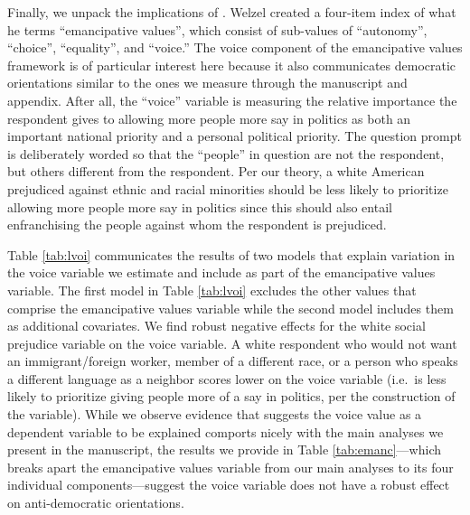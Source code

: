\documentclass[11pt,]{article}
\begin{document}
Finally, we unpack the implications of \citet{welzel2013fr}. Welzel
created a four-item index of what he terms ``emancipative values'',
which consist of sub-values of ``autonomy'', ``choice'', ``equality'',
and ``voice.'' The voice component of the emancipative values framework
is of particular interest here because it also communicates democratic
orientations similar to the ones we measure through the manuscript and
appendix. After all, the ``voice'' variable is measuring the relative
importance the respondent gives to allowing more people more say in
politics as both an important national priority and a personal political
priority. The question prompt is deliberately worded so that the
``people'' in question are not the respondent, but others different from
the respondent. Per our theory, a white American prejudiced against
ethnic and racial minorities should be less likely to prioritize
allowing more people more say in politics since this should also entail
enfranchising the people against whom the respondent is prejudiced.

Table \ref{tab:lvoi} communicates the results of two models that explain
variation in the voice variable we estimate and include as part of the
emancipative values variable. The first model in Table \ref{tab:lvoi}
excludes the other values that comprise the emancipative values variable
while the second model includes them as additional covariates. We find
robust negative effects for the white social prejudice variable on the
voice variable. A white respondent who would not want an
immigrant/foreign worker, member of a different race, or a person who
speaks a different language as a neighbor scores lower on the voice
variable (i.e.~is less likely to prioritize giving people more of a say
in politics, per the construction of the variable). While we observe
evidence that suggests the voice value as a dependent variable to be
explained comports nicely with the main analyses we present in the
manuscript, the results we provide in Table \ref{tab:emanc}---which
breaks apart the emancipative values variable from our main analyses to
its four individual components---suggest the voice variable does not
have a robust effect on anti-democratic orientations.

 
  \providecommand{\huxb}[2]{\arrayrulecolor[RGB]{#1}\global\arrayrulewidth=#2pt}
  \providecommand{\huxvb}[2]{\color[RGB]{#1}\vrule width #2pt}
  \providecommand{\huxtpad}[1]{\rule{0pt}{\baselineskip+#1}}
  \providecommand{\huxbpad}[1]{\rule[-#1]{0pt}{#1}}
\end{document}
